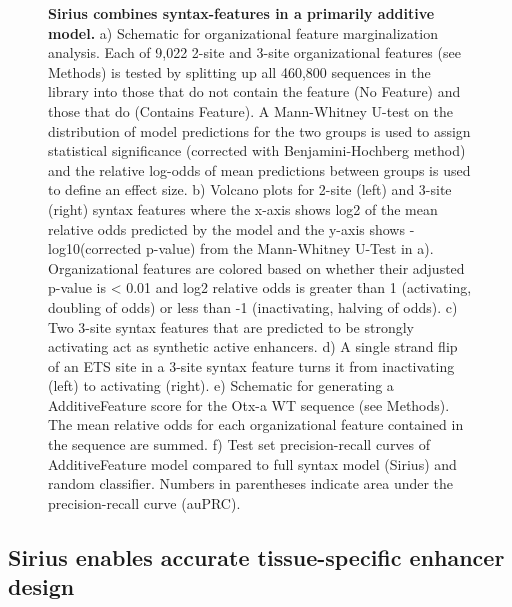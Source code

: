 \begin{figure}[p]
    \caption[Sirius combines syntax-features in a primarily additive model.]{\textbf{Sirius combines syntax-features in a primarily additive model.} a) Schematic for organizational feature marginalization analysis. Each of 9,022 2-site and 3-site organizational features (see Methods) is tested by splitting up all 460,800 sequences in the library into those that do not contain the feature (No Feature) and those that do (Contains Feature). A Mann-Whitney U-test on the distribution of model predictions for the two groups is used to assign statistical significance (corrected with Benjamini-Hochberg method) and the relative log-odds of mean predictions between groups is used to define an effect size. b) Volcano plots for 2-site (left) and 3-site (right) syntax features where the x-axis shows log2 of the mean relative odds predicted by the model and the y-axis shows -log10(corrected p-value) from the Mann-Whitney U-Test in a). Organizational features are colored based on whether their adjusted p-value is < 0.01 and log2 relative odds is greater than 1 (activating, doubling of odds) or less than -1 (inactivating, halving of odds). c) Two 3-site syntax features that are predicted to be strongly activating act as synthetic active enhancers. d) A single strand flip of an ETS site in a 3-site syntax feature turns it from inactivating (left) to activating (right). e) Schematic for generating a AdditiveFeature score for the Otx-a WT sequence (see Methods). The mean relative odds for each organizational feature contained in the sequence are summed. f) Test set precision-recall curves of AdditiveFeature model compared to full syntax model (Sirius) and random classifier. Numbers in parentheses indicate area under the precision-recall curve (auPRC).}
    \label{fig:2 Figure 3}
\end{figure}

\subsection{Sirius enables accurate tissue-specific enhancer design}

